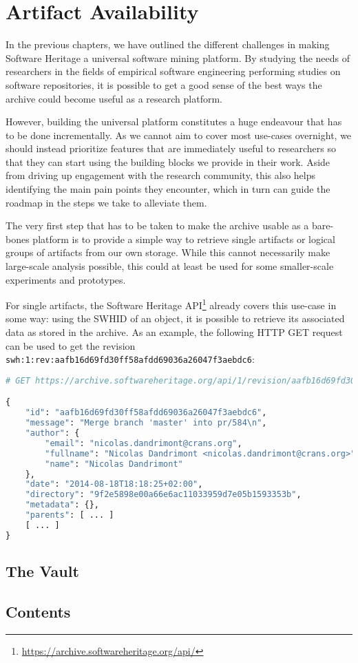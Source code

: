 \chapter{Artifact Availability}

In the previous chapters, we have outlined the different challenges in making
Software Heritage a universal software mining platform. By studying the needs
of researchers in the fields of empirical software engineering performing
studies on software repositories, it is possible to get a good sense of the
best ways the archive could become useful as a research platform.

However, building the universal platform constitutes a huge endeavour that has
to be done incrementally. As we cannot aim to cover most use-cases overnight,
we should instead prioritize features that are immediately useful to
researchers so that they can start using the building blocks we provide in
their work. Aside from driving up engagement with the research community, this
also helps identifying the main pain points they encounter, which in turn can
guide the roadmap in the steps we take to alleviate them.

The very first step that has to be taken to make the archive usable as a
bare-bones platform is to provide a simple way to retrieve single artifacts or
logical groups of artifacts from our own storage. While this cannot necessarily
make large-scale analysis possible, this could at least be used for some
smaller-scale experiments and prototypes.

For single artifacts, the Software Heritage
API\footnote{\url{https://archive.softwareheritage.org/api/}} already covers
this use-case in some way: using the \gls{SWHID} of an object, it is possible
to retrieve its associated data as stored in the archive. As an example, the
following HTTP GET request can be used to get the revision
\texttt{swh:1:rev:aafb16d69fd30ff58afdd69036a26047f3aebdc6}:

\begin{lstlisting}[language=python,frame=single]
# GET https://archive.softwareheritage.org/api/1/revision/aafb16d69fd30ff58afdd69036a26047f3aebdc6/

{
    "id": "aafb16d69fd30ff58afdd69036a26047f3aebdc6",
    "message": "Merge branch 'master' into pr/584\n",
    "author": {
        "email": "nicolas.dandrimont@crans.org",
        "fullname": "Nicolas Dandrimont <nicolas.dandrimont@crans.org>",
        "name": "Nicolas Dandrimont"
    },
    "date": "2014-08-18T18:18:25+02:00",
    "directory": "9f2e5898e00a66e6ac11033959d7e05b1593353b",
    "metadata": {},
    "parents": [ ... ]
    [ ... ]
}
\end{lstlisting}

\section{The Vault}

\section{Contents}
